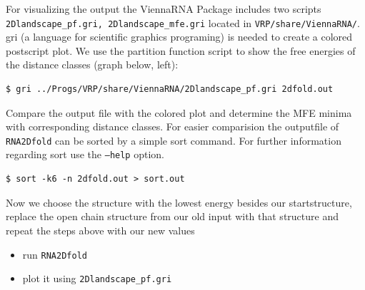 \documentclass[a4paper]{article}
\begin{document}
For visualizing the output the ViennaRNA Package includes two scripts 
\texttt{2Dlandscape\_pf.gri, 2Dlandscape\_mfe.gri} located in \texttt{VRP/share/ViennaRNA/}. 
gri (a language for scientific graphics programing) is needed to create a colored 
postscript plot. We use the partition function script to show the free energies of 
the distance classes (graph below, left):

\begin{verbatim}
$ gri ../Progs/VRP/share/ViennaRNA/2Dlandscape_pf.gri 2dfold.out
\end{verbatim}

Compare the output file with the colored plot and determine the MFE minima with 
corresponding distance classes. For easier comparision the outputfile of \texttt{RNA2Dfold} can be
sorted by a simple sort command. For further information regarding sort use the \texttt{--help} option.
\begin{verbatim}
$ sort -k6 -n 2dfold.out > sort.out
\end{verbatim}
Now we choose the structure with the lowest energy besides our startstructure,
replace the open chain structure from our old input with that structure and repeat the steps above 
with our new values

\begin{itemize}
\item run \texttt{RNA2Dfold} 
\item plot it using \texttt{2Dlandscape\_pf.gri}\\
\end{itemize}
\end{document}
